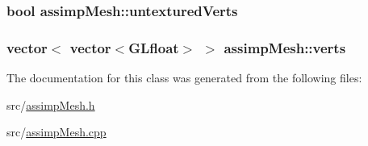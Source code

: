 \hypertarget{classassimp_mesh_a17eccca561b80ff903e4845aaa29b6cf}{
\subsubsection[{untextured\-Verts}]{\setlength{\rightskip}{0pt plus 5cm}bool assimp\-Mesh\-::untextured\-Verts}}\label{classassimp_mesh_a17eccca561b80ff903e4845aaa29b6cf}
\hypertarget{classassimp_mesh_aafe85632fb36e3b7a55f5e49023feaa1}{
\subsubsection[{verts}]{\setlength{\rightskip}{0pt plus 5cm}vector$<$ vector$<${\bf G\-Lfloat}$>$ $>$ assimp\-Mesh\-::verts}}\label{classassimp_mesh_aafe85632fb36e3b7a55f5e49023feaa1}


The documentation for this class was generated from the following files\-:\begin{DoxyCompactItemize}
\item 
src/\hyperlink{assimp_mesh_8h}{assimp\-Mesh.\-h}\item 
src/\hyperlink{assimp_mesh_8cpp}{assimp\-Mesh.\-cpp}\end{DoxyCompactItemize}
